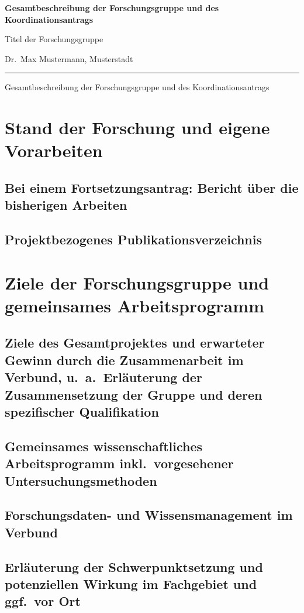 \documentclass{scrartcl}
\newcommand{\spokesperson}{Dr.\ Max Mustermann, Musterstadt}
\newcommand{\project}{Titel der Forschungsgruppe}
\begin{document}
{\raggedright{} \normalsize \bfseries 
	Gesamtbeschreibung der Forschungsgruppe und des Koordinationsantrags \par
    \project{} \par
    \spokesperson{} \par
	\rule{\textwidth}{0.5pt} \par
	Gesamtbeschreibung der Forschungsgruppe und des Koordinationsantrags
}

\section{Stand der Forschung und eigene Vorarbeiten}

\subsection{Bei einem Fortsetzungsantrag: Bericht über die bisherigen Arbeiten}

\subsection{Projektbezogenes Publikationsverzeichnis}
\printbibliography[heading=none]


\section{Ziele der Forschungsgruppe und gemeinsames Arbeitsprogramm}

\subsection{Ziele des Gesamtprojektes und erwarteter Gewinn durch die Zusammenarbeit im Verbund, u.\ a.\ Erläuterung der Zusammensetzung der Gruppe und deren spezifischer Qualifikation}

\subsection{Gemeinsames wissenschaftliches Arbeitsprogramm inkl.\ vorgesehener Untersuchungsmethoden}

\subsection{Forschungsdaten- und Wissensmanagement im Verbund}

\subsection{Erläuterung der Schwerpunktsetzung und potenziellen Wirkung im Fachgebiet und ggf.\ vor Ort}
\end{document}
